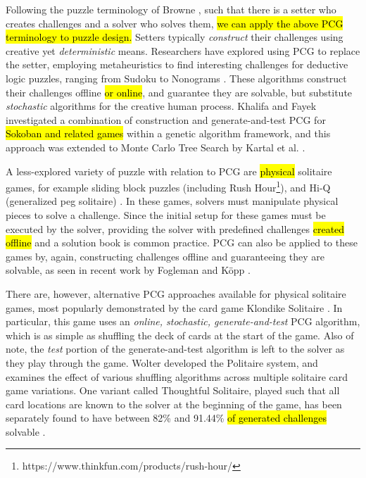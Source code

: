 \documentclass[journal]{IEEEtran}
\begin{document}
Following the puzzle terminology of Browne \cite{PUZZLENATURE}, such that there is a setter who creates challenges and a solver who solves them, \hl{we can apply the above PCG terminology to puzzle design.} Setters typically {\it construct} their challenges using creative yet {\it deterministic} means. 
Researchers have explored using PCG to replace the setter, employing metaheuristics to find interesting challenges for deductive logic puzzles, ranging from Sudoku \cite{SUDOKU} to Nonograms \cite{NONOGRAM}. These algorithms construct their challenges offline \hl{or online}, and guarantee they are solvable, but substitute {\it stochastic} algorithms for the creative human process. Khalifa and Fayek\cite{PUZZLELANG} investigated a combination of construction and generate-and-test PCG for \hl{Sokoban and related games} within a genetic algorithm framework, and this approach was extended to Monte Carlo Tree Search by Kartal et al. \cite{SOKOBAN}.

A less-explored variety of puzzle with relation to PCG 
are \hl{physical} solitaire games, for example
sliding block puzzles \cite{FIFTEEN} (including Rush Hour\footnote{https://www.thinkfun.com/products/rush-hour/}), 
and Hi-Q (generalized peg solitaire) \cite{PEG}. In these games, solvers must manipulate physical pieces to solve a challenge. Since the initial setup for these games must be executed by the solver, providing the solver with predefined challenges \hl{created offline} and a solution book is common practice. PCG can also be applied to these games by, again, constructing challenges offline and guaranteeing they are solvable, as seen in recent work by Fogleman \cite{RUSHHOUR} and K{\"o}pp \cite{TANGRAM}. 

There are, however, alternative PCG approaches available for physical solitaire games, most popularly demonstrated by the card game Klondike Solitaire \cite{morehead2014complete}. In particular, this game uses an {\it online, stochastic, generate-and-test} PCG algorithm, which is as simple as shuffling the deck of cards at the start of the game. Also of note, the {\it test} portion of the generate-and-test algorithm is left to the solver as they play through the game. Wolter \cite{SOLITAIREVARIANTS} developed the Politaire system, and examines the effect of various shuffling algorithms across multiple solitaire card game variations. One variant called Thoughtful Solitaire, played such that all card locations are known to the solver at the beginning of the game, has been separately found to have between 82\% and 91.44\% \hl{of generated challenges} solvable \cite{THOUGHTFUL}. 
\end{document}
